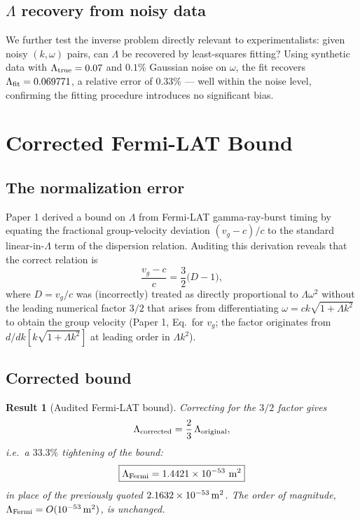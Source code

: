 \documentclass[12pt,a4paper]{article}
\newtheorem{result}{Result}
\begin{document}
\subsection{$\Lambda$ recovery from noisy data}

We further test the inverse problem directly relevant to
experimentalists: given noisy $(k,\omega)$ pairs, can $\Lambda$ be
recovered by least-squares fitting? Using synthetic data with
$\Lambda_{\rm true}=0.07$ and $0.1\%$ Gaussian noise on $\omega$, the
fit recovers $\Lambda_{\rm fit}=0.069771$, a relative error of $0.33\%$
--- well within the noise level, confirming the fitting procedure
introduces no significant bias.

\section{Corrected Fermi-LAT Bound}
\label{sec:fermi}

\subsection{The normalization error}

Paper 1 derived a bound on $\Lambda$ from Fermi-LAT gamma-ray-burst
timing \citep{Abdo2009} by equating the fractional group-velocity
deviation $(v_g-c)/c$ to the standard linear-in-$\Lambda$ term of the
dispersion relation. Auditing this derivation reveals that the correct
relation is
\begin{equation}
  \frac{v_g - c}{c} = \frac{3}{2}\bigl(D-1\bigr),
\end{equation}
where $D=v_g/c$ was (incorrectly) treated as directly proportional to
$\Lambda\omega^2$ without the leading numerical factor $3/2$ that arises
from differentiating $\omega=ck\sqrt{1+\Lambda k^2}$ to obtain the group
velocity (Paper 1, Eq.~for $v_g$; the factor originates from
$d/dk[k\sqrt{1+\Lambda k^2}]$ at leading order in $\Lambda k^2$).

\subsection{Corrected bound}

\begin{result}[Audited Fermi-LAT bound]
Correcting for the $3/2$ factor gives
\begin{equation}
  \Lambda_{\rm corrected} = \frac{2}{3}\,\Lambda_{\rm original},
\end{equation}
i.e.\ a $33.3\%$ tightening of the bound:
\begin{equation}
  \boxed{\Lambda_{\rm Fermi} = 1.4421\times10^{-53}\ {\rm m^2}}
\end{equation}
in place of the previously quoted $2.1632\times10^{-53}\,{\rm m^2}$. The
order of magnitude, $\Lambda_{\rm Fermi}=O(10^{-53}\,{\rm m^2})$, is
unchanged.
\end{result}
\end{document}
